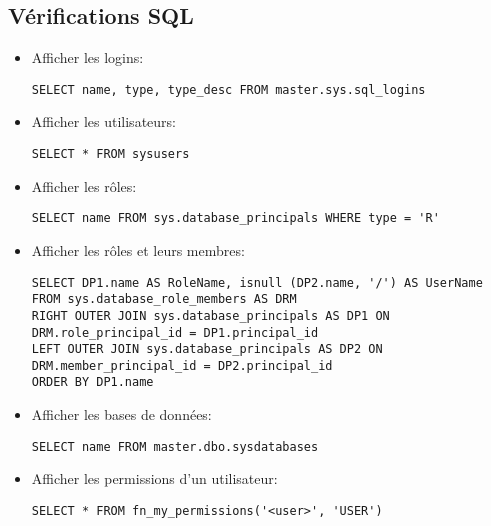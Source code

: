 \documentclass[a4paper]{article}
\begin{document}
\subsection{Vérifications SQL}





\begin{itemize}



\item Afficher les logins:
\begin{verbatim}
SELECT name, type, type_desc FROM master.sys.sql_logins
\end{verbatim}



\item Afficher les utilisateurs:
\begin{verbatim}
SELECT * FROM sysusers
\end{verbatim}



\item Afficher les rôles:
\begin{verbatim}
SELECT name FROM sys.database_principals WHERE type = 'R'
\end{verbatim}



\item Afficher les rôles et leurs membres:
\begin{verbatim}
SELECT DP1.name AS RoleName, isnull (DP2.name, '/') AS UserName
FROM sys.database_role_members AS DRM
RIGHT OUTER JOIN sys.database_principals AS DP1 ON DRM.role_principal_id = DP1.principal_id
LEFT OUTER JOIN sys.database_principals AS DP2 ON DRM.member_principal_id = DP2.principal_id
ORDER BY DP1.name
\end{verbatim}



\item Afficher les bases de données:
\begin{verbatim}
SELECT name FROM master.dbo.sysdatabases
\end{verbatim}



\item Afficher les permissions d'un utilisateur:
\begin{verbatim}
SELECT * FROM fn_my_permissions('<user>', 'USER')
\end{verbatim}



\end{itemize}
\end{document}
